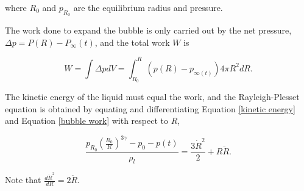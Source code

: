 where $R_0$ and $p_{R_0}$ are the equilibrium radius and pressure. 

The work done to expand the bubble is only carried out by the net pressure, $\Delta p = P(R)-P_{\infty}(t)$, and the total work $W$ is

\begin{equation}
\label{bubble work}
W = \int \Delta p dV = \int_{R_0}^R (p(R)-p_{\infty(t)})4\pi R^2 dR.
\end{equation}

The kinetic energy of the liquid must equal the work, and the Rayleigh-Plesset equation is obtained by equating and differentiating Equation \eqref{kinetic energy} and Equation \eqref{bubble work} with respect to $R$, 

\begin{equation}
\label{RPE}
\frac{p_{R_0}\left(\frac{R_0}{R}\right)^{3\gamma}-p_0 - p(t)}{\rho_l} = \frac{3\dot{R}^2}{2}+R\ddot{R}.
\end{equation}

Note that $\frac{d\dot{R}^2}{dR} = 2\ddot{R}$. 
